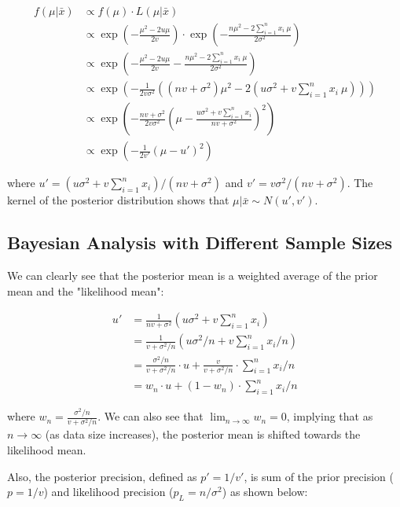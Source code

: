 \begin{align*}
  f(\mu | \bar{x}) &\propto f(\mu) \cdot L(\mu | \bar{x}) \\
  &\propto \exp\left(-\frac{\mu^2 - 2u \mu}{2v}\right) \cdot \exp\left(-\frac{n \mu^2 - 2\sum_{i = 1}^{n} x_i ~ \mu}{2\sigma^2}\right) \\
  &\propto \exp\left(-\frac{\mu^2 - 2u \mu}{2v} - \frac{n \mu^2 - 2\sum_{i = 1}^{n} x_i ~ \mu}{2\sigma^2}\right) \\
  &\propto \exp\left(-\frac{1}{2v \sigma^2} \left((n v + \sigma^2) \mu^2 - 2(u \sigma^2 + v \sum_{i = 1}^{n} x_i ~ \mu)\right)\right) \\
  &\propto \exp\left(-\frac{n v + \sigma^2}{2v \sigma^2} \left(\mu - \frac{u \sigma^2 + v \sum_{i = 1}^{n} x_i}{n v + \sigma^2}\right)^2\right) \\
  &\propto \exp\left(-\frac{1}{2v'} (\mu - u')^2\right)
\end{align*}

\noindent where $u' = \left(u \sigma^2 + v \sum_{i = 1}^{n} x_i\right) / (n v + \sigma^2)$ and $v' = v \sigma^2/(n v + \sigma^2)$.
The kernel of the posterior distribution shows that $\mu | \bar{x} \sim N(u', v')$.


\subsection{Bayesian Analysis with Different Sample Sizes}

We can clearly see that the posterior mean is a weighted average of the prior mean and the "likelihood mean":

\begin{align*}
  u' &= \frac{1}{n v + \sigma^2} \left(u \sigma^2 + v \sum_{i = 1}^{n} x_i\right) \\
  &= \frac{1}{v + \sigma^2 / n} \left(u \sigma^2 / n + v \sum_{i = 1}^{n} x_i / n\right) \\
  &= \frac{\sigma^2 / n}{v + \sigma^2 / n} \cdot u + \frac{v}{v + \sigma^2 / n} \cdot \sum_{i = 1}^{n} x_i / n \\
  &= w_n \cdot u + (1 - w_n) \cdot \sum_{i = 1}^{n} x_i / n
\end{align*}

where $w_n = \frac{\sigma^2 / n}{v + \sigma^2 / n}$.
We can also see that $\lim_{n \to \infty} w_n = 0$, implying that as $n \to \infty$ (as data size increases), the posterior mean is shifted towards the likelihood mean.

Also, the posterior precision, defined as $p' = 1 / v'$, is sum of the prior precision ($p = 1 / v$) and likelihood precision ($p_L = n / \sigma^2$) as shown below:

